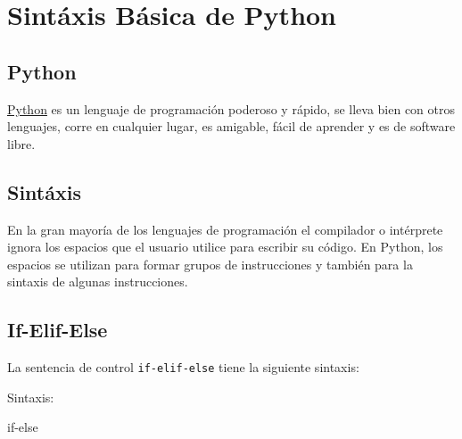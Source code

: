 \chapter{Sintáxis Básica de Python}
\section{Python}

\href{https://www.python.org/about/}{Python} es un lenguaje de
programación poderoso y rápido, se lleva bien con otros lenguajes, corre
en cualquier lugar, es amigable, fácil de aprender y es de software
libre.

\section{Sintáxis}

En la gran mayoría de los lenguajes de programación el compilador o
intérprete ignora los espacios que el usuario utilice para escribir su
código. En Python, los espacios se utilizan para formar grupos de
instrucciones y también para la sintaxis de algunas instrucciones.

\section{If-Elif-Else}

La sentencia de control \texttt{if-elif-else} tiene la siguiente
sintaxis:

Sintaxis:

\begin{Shaded}
\begin{Highlighting}[]
\NormalTok{:}

\end{Highlighting}
\end{Shaded}


\begin{code} if-else
\begin{Shaded}
\begin{Highlighting}[]
     \OperatorTok{\textless{}}\NormalTok{:}
        \NormalTok{(}\NormalTok{)}
    \NormalTok{:}
        \NormalTok{(}\NormalTok{)}
    \NormalTok{(}\NormalTok{)}

\end{Highlighting}
\end{Shaded}
\end{code}

